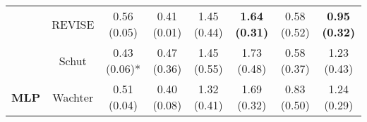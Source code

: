 \begin{table}
{\begin{tabular}[t]{>{}cccccccc}
 & REVISE & 0.56 (0.05) & 0.41 (0.01) & 1.45 (0.44) & \textbf{1.64 (0.31)} & 0.58 (0.52) & \textbf{0.95 (0.32)}\\

 & Schut & 0.43 (0.06)* & 0.47 (0.36) & 1.45 (0.55) & 1.73 (0.48) & 0.58 (0.37) & 1.23 (0.43)\\

\multirow{-6}{*}{\centering\arraybackslash \textbf{MLP}} & Wachter & 0.51 (0.04) & 0.40 (0.08) & 1.32 (0.41) & 1.69 (0.32) & 0.83 (0.50) & 1.24 (0.29)\\
\bottomrule
\end{tabular}}
\end{table}
